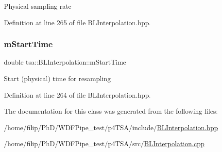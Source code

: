 Physical sampling rate 

Definition at line 265 of file B\+L\+Interpolation.\+hpp.

\mbox{\label{classtsa_1_1_b_l_interpolation_afed34dd05a75cc0eb6ce313a584aa9ef}} 
\subsubsection{\texorpdfstring{m\+Start\+Time}{mStartTime}}
{\footnotesize\ttfamily double tsa\+::\+B\+L\+Interpolation\+::m\+Start\+Time\hspace{0.3cm}{\ttfamily [private]}}

Start (physical) time for resampling 

Definition at line 264 of file B\+L\+Interpolation.\+hpp.



The documentation for this class was generated from the following files\+:\begin{DoxyCompactItemize}
\item 
/home/filip/\+Ph\+D/\+W\+D\+F\+Pipe\+\_\+test/p4\+T\+S\+A/include/\hyperlink{_b_l_interpolation_8hpp}{B\+L\+Interpolation.\+hpp}\item 
/home/filip/\+Ph\+D/\+W\+D\+F\+Pipe\+\_\+test/p4\+T\+S\+A/src/\hyperlink{_b_l_interpolation_8cpp}{B\+L\+Interpolation.\+cpp}\end{DoxyCompactItemize}
